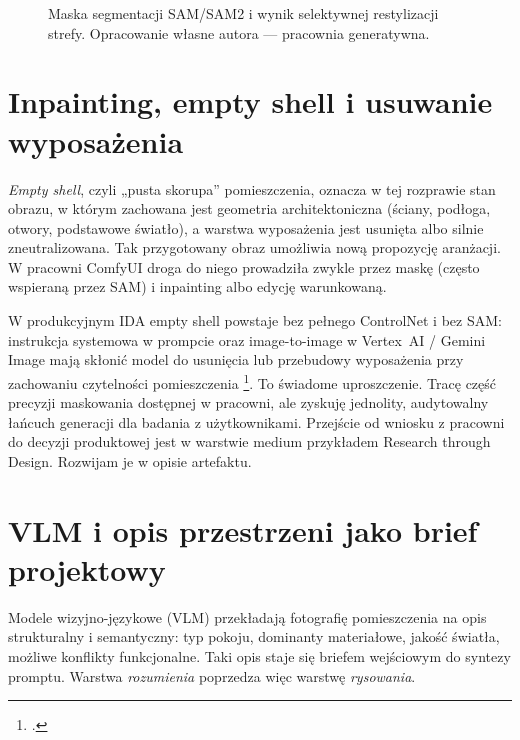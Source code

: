 \begin{figure}[htbp]
  \centering
  \caption{Maska segmentacji SAM/SAM2 i wynik selektywnej restylizacji strefy.
  Opracowanie własne autora --- pracownia generatywna.}
  \label{fig:ch04:sam}
\end{figure}

\section{Inpainting, empty shell i usuwanie wyposażenia}
\label{ch04:sec:inpaint}

\emph{Empty shell}, czyli „pusta skorupa” pomieszczenia, oznacza w tej rozprawie stan obrazu, w którym zachowana jest geometria architektoniczna (ściany, podłoga, otwory, podstawowe światło), a warstwa wyposażenia jest usunięta albo silnie zneutralizowana.
Tak przygotowany obraz umożliwia nową propozycję aranżacji. W pracowni ComfyUI droga do niego prowadziła zwykle przez maskę (często wspieraną przez SAM) i inpainting albo edycję warunkowaną.

W produkcyjnym IDA empty shell powstaje bez pełnego ControlNet i bez SAM: instrukcja systemowa w prompcie oraz image-to-image w Vertex~AI / Gemini Image mają skłonić model do usunięcia lub przebudowy wyposażenia przy zachowaniu czytelności pomieszczenia \footcite{idaPlatform2026}.
To świadome uproszczenie. Tracę część precyzji maskowania dostępnej w pracowni, ale zyskuję jednolity, audytowalny łańcuch generacji dla badania z użytkownikami.
Przejście od wniosku z pracowni do decyzji produktowej jest w warstwie medium przykładem Research through Design. Rozwijam je w opisie artefaktu.

\section{VLM i opis przestrzeni jako brief projektowy}
\label{ch04:sec:vlm}

Modele wizyjno-językowe (VLM) przekładają fotografię pomieszczenia na opis strukturalny i semantyczny: typ pokoju, dominanty materiałowe, jakość światła, możliwe konflikty funkcjonalne.
Taki opis staje się briefem wejściowym do syntezy promptu. Warstwa \emph{rozumienia} poprzedza więc warstwę \emph{rysowania}.

